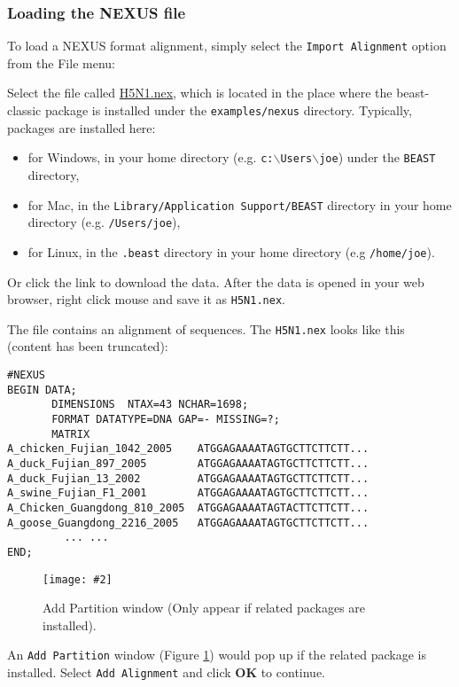 \documentclass{article}
\newcommand{\includeimage}[2][]{%
\texttt{[image: \#2]}
}
\begin{document}
\subsubsection*{Loading the NEXUS file }

To load a NEXUS format alignment, simply select the \texttt{Import
Alignment} option from the File menu: 

Select the file called \href{http://beast-classic.googlecode.com/svn/trunk/examples/nexus/H5N1.nex}{H5N1.nex},
which is located in the place where the beast-classic package is installed
under the {\tt examples/nexus} directory. Typically, packages are installed here:
\begin{itemize}
\item for Windows, in your home directory (e.g. {\tt c:$\backslash$Users$\backslash$joe}) under the {\tt BEAST} directory,
\item for Mac, in the {\tt Library/Application Support/BEAST} directory in your home directory (e.g. {\tt /Users/joe}),
\item for Linux, in the {\tt .beast} directory in your home directory (e.g {\tt /home/joe}).
\end{itemize}
Or click the link to download the data. After the data is opened in your web browser, right click mouse and save it as \texttt{H5N1.nex}.

The file contains an alignment of sequences. The \texttt{H5N1.nex} looks like this (content has been truncated):

\begin{verbatim}
#NEXUS
BEGIN DATA;
       DIMENSIONS  NTAX=43 NCHAR=1698;
       FORMAT DATATYPE=DNA GAP=- MISSING=?;
       MATRIX 	
A_chicken_Fujian_1042_2005    ATGGAGAAAATAGTGCTTCTTCTT...
A_duck_Fujian_897_2005        ATGGAGAAAATAGTGCTTCTTCTT...
A_duck_Fujian_13_2002         ATGGAGAAAATAGTGCTTCTTCTT...
A_swine_Fujian_F1_2001        ATGGAGAAAATAGTGCTTCTTCTT...
A_Chicken_Guangdong_810_2005  ATGGAGAAAATAGTACTTCTTCTT...
A_goose_Guangdong_2216_2005   ATGGAGAAAATAGTGCTTCTTCTT...
         ... ...
END;
\end{verbatim}

\begin{figure}
\centering	
\includeimage[width=0.5\textwidth]{figures/AddPartition}
\caption{Add Partition window (Only appear if related packages are installed).}
\label{fig:addPartition}
\end{figure}

An \texttt{Add Partition} window (Figure \ref{fig:addPartition}) would pop up if the related package is installed. Select \texttt{Add Alignment} and click \textbf{OK} to continue.
\end{document}
